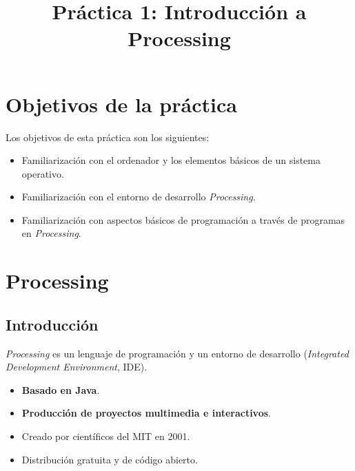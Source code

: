 \documentclass[
  spanish,
  11pt,
  a4paper,
  DIV=11,
  numbers=noendperiod]{scrartcl}
\title{Práctica 1: Introducción a Processing}
\author{}
\date{}
\providecommand{\tightlist}{%
  \setlength{\itemsep}{0pt}\setlength{\parskip}{0pt}}
\renewcommand*\contentsname{Tabla de contenidos}
\newcommand\contentsname{Tabla de contenidos}
\begin{document}
\maketitle

\renewcommand*\contentsname{Tabla de contenidos}
{
\hypersetup{linkcolor=}
\setcounter{tocdepth}{2}
\tableofcontents
}

\clearpage

\section{Objetivos de la práctica}

\label{objetivos-de-la-práctica}

Los objetivos de esta práctica son los siguientes:

\begin{itemize}
\tightlist
\item
  Familiarización con el ordenador y los elementos básicos de un sistema operativo.
\item
  Familiarización con el entorno de desarrollo \emph{Processing}.
\item
  Familiarización con aspectos básicos de programación a través de programas en \emph{Processing}.
\end{itemize}

\section{Processing}

\label{processing}

\subsection{Introducción}

\label{introducción}

\emph{Processing} es un lenguaje de programación y un entorno de desarrollo (\emph{Integrated Development Environment}, IDE).

\begin{itemize}
\tightlist
\item
  \textbf{Basado en Java}.
\item
  \textbf{Producción de proyectos multimedia e interactivos}.
\item
  Creado por científicos del MIT en 2001.
\item
  Distribución gratuita y de código abierto.
\end{itemize}
\end{document}
